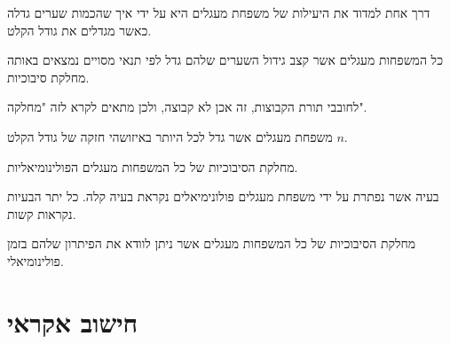 \documentclass{tstextbook}
\begin{document}
\begin{proposition}
דרך אחת למדוד את היעילות של משפחת מעגלים היא על ידי איך שהכמות שערים גדלה כאשר מגדלים את גודל הקלט. 

\end{proposition}
\begin{definition}
כל המשפחות מעגלים אשר קצב גידול השערים שלהם גדל לפי תנאי מסויים נמצאים באותה מחלקת סיבוכיות.

\end{definition}
\begin{remark}
לחובבי תורת הקבוצות, זה אכן לא קבוצה, ולכן מתאים לקרא לזה "מחלקה".

\end{remark}
\begin{definition}
משפחת מעגלים אשר גדל לכל היותר באיזושהי חזקה של גודל הקלט \(n\).

\end{definition}
\begin{definition}
מחלקת הסיבוכיות של כל המשפחות מעגלים הפולינומיאליות.

\end{definition}
\begin{definition}
בעיה אשר נפתרת על ידי משפחת מעגלים פולונימיאלים נקראת בעיה קלה. כל יתר הבעיות נקראות קשות.

\end{definition}
\begin{definition}
מחלקת הסיבוכיות של כל המשפחות מעגלים אשר ניתן לוודא את הפיתרון שלהם בזמן פולינומיאלי.

\end{definition}
\section{חישוב אקראי}
\end{document}
